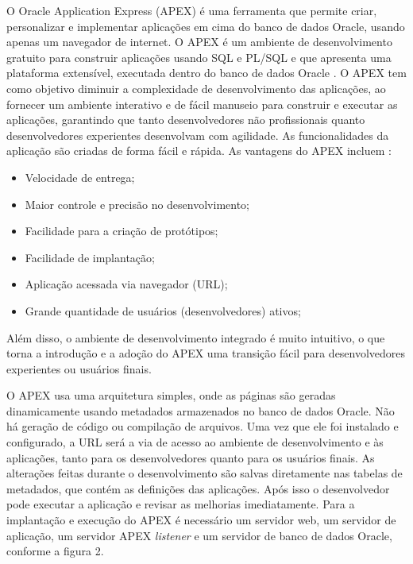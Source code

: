 O Oracle Application Express (APEX) é uma ferramenta que permite criar, personalizar e implementar aplicações em cima do banco de dados Oracle, usando apenas um navegador de internet. O APEX é um ambiente de desenvolvimento gratuito para construir aplicações usando SQL e PL/SQL e que apresenta uma plataforma extensível, executada dentro do banco de dados Oracle \cite{oracleApex}. O APEX tem como objetivo diminuir a complexidade de desenvolvimento das aplicações, ao fornecer um ambiente interativo e de fácil manuseio para construir e executar as aplicações, garantindo que tanto desenvolvedores não profissionais quanto desenvolvedores experientes desenvolvam com agilidade. As funcionalidades da aplicação são criadas de forma fácil e rápida. As vantagens do APEX incluem \cite{oracleApex}:
\begin{itemize}
\item Velocidade de entrega;
\item Maior controle e precisão no desenvolvimento;
\item Facilidade para a criação de protótipos;
\item Facilidade de implantação;
\item Aplicação acessada via navegador (URL);
\item Grande quantidade de usuários (desenvolvedores) ativos;
\end{itemize}

Além disso, o ambiente de desenvolvimento integrado é muito intuitivo, o que torna a introdução e a adoção do APEX uma transição fácil para desenvolvedores experientes ou usuários finais.

O APEX usa uma arquitetura simples, onde as páginas são geradas dinamicamente usando metadados armazenados no banco de dados Oracle. Não há geração de código ou compilação de arquivos. Uma vez que ele foi instalado e configurado, a URL será a via de acesso ao ambiente de desenvolvimento e às aplicações, tanto para os desenvolvedores quanto para os usuários finais. As alterações feitas durante o desenvolvimento são salvas diretamente nas tabelas de metadados, que contém as definições das aplicações. Após isso o desenvolvedor pode executar a aplicação e revisar as melhorias imediatamente.
Para a implantação e execução do APEX é necessário um servidor web, um servidor de aplicação, um servidor APEX \textit{listener} e um servidor de banco de dados Oracle, conforme a figura 2.
\clearpage

